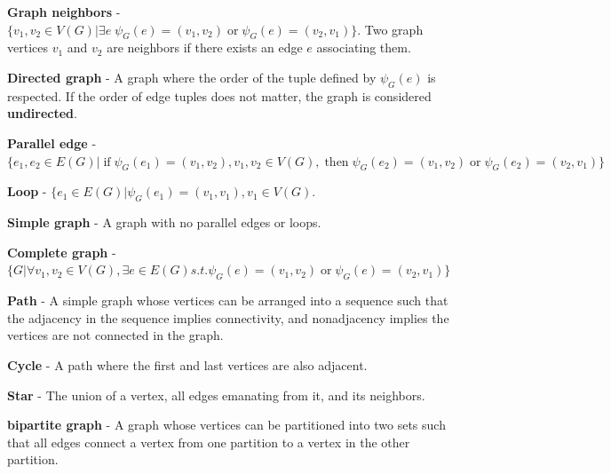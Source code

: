 \begin{defn}
  \textbf{Graph neighbors} - $\{v_1,v_2 \in V(G) | \exists e\; \psi_G(e) =
  (v_1,v_2) \;\text{or}\; \psi_G(e) = (v_2,v_1) \}$. Two graph vertices $v_1$ and $v_2$ are
  neighbors if there exists an edge $e$ associating them.
\end{defn}

\begin{defn}
  \textbf{Directed graph} - A graph where the order of the tuple defined by
  $\psi_G(e)$ is respected. If the order of edge tuples does not matter, the
  graph is considered \textbf{undirected}.
\end{defn}

\begin{defn}
  \textbf{Parallel edge} - $\{e_1,e_2 \in E(G) | \;\text{if}\; \psi_G(e_1) = (v_1,v_2),
  v_1,v_2 \in V(G), \;\text{then}\; \psi_G(e_2) = (v_1,v_2) \;\text{or}\; \psi_G(e_2) = (v_2,v_1) \}$
\end{defn}

\begin{defn}
  \textbf{Loop} - $\{e_1 \in E(G) | \psi_G(e_1) = (v_1,v_1), v_1 \in V(G)$.
\end{defn}

\begin{defn}
  \textbf{Simple graph} - A graph with no parallel edges or loops.
\end{defn}

\begin{defn}
  \textbf{Complete graph} - $\{G | \forall v_1,v_2 \in V(G), \exists e\in E(G)
  s.t. \psi_G(e) = (v_1,v_2) \;\text{or}\; \psi_G(e) = (v_2,v_1)\}$
\end{defn}

\begin{defn}
  \textbf{Path} - A simple graph whose vertices can be arranged into a sequence
  such that the adjacency in the sequence implies connectivity, and
  nonadjacency implies the vertices are not connected in the graph.
\end{defn}

\begin{defn}
  \textbf{Cycle} - A path where the first and last vertices are also adjacent.
\end{defn}

\begin{defn}
  \textbf{Star} - The union of a vertex, all edges emanating from it, and its
  neighbors.
\end{defn}

\begin{defn}
\textbf{bipartite graph} - A graph whose vertices can be partitioned into two sets such that all edges connect a vertex from one partition to a vertex in the other partition.
\end{defn}

